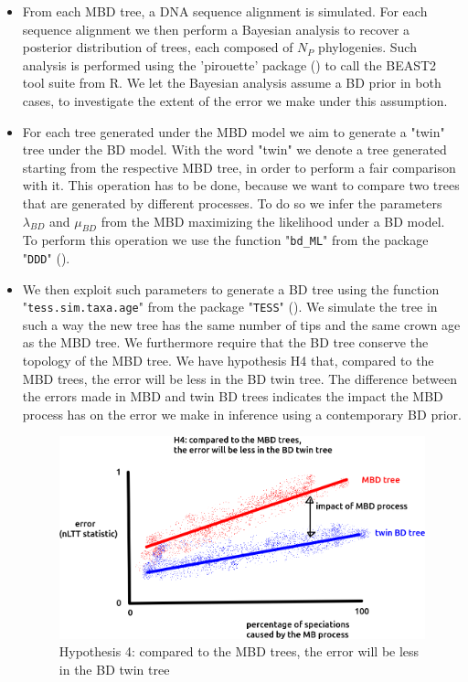 \documentclass{article}
\begin{document}
\begin{itemize}
\item From each MBD tree, a DNA sequence alignment is simulated. 
For each sequence alignment we then perform a Bayesian analysis 
to recover a posterior distribution of trees, 
each composed of $N_{P}$ phylogenies. 
Such analysis is performed using 
the 'pirouette' package (\cite{pirouette}) to call the BEAST2 tool 
suite from R. 
We let the Bayesian analysis assume a BD prior in both cases, 
to investigate the extent of the error we make under this assumption.

\item For each tree generated under the MBD model 
we aim to generate a "twin" tree under the BD model. 
With the word "twin" 
we denote a tree generated starting from the respective MBD tree, 
in order to perform a fair comparison with it. 
This operation has to be done, 
because we want to compare two trees 
that are generated by different processes. 
To do so we infer the parameters $\lambda_{BD}$ and $\mu_{BD}$ 
from the MBD maximizing the likelihood under a BD model. 
To perform this operation we use the function "\texttt{bd\_ML}" 
from the package "\texttt{DDD}" (\cite{etienne2012diversity}). 

\item We then exploit such parameters to generate a BD tree 
using the function "\texttt{tess.sim.taxa.age}" 
from the package "\texttt{TESS}" (\cite{Hoehna2013}). 
We simulate the tree in such a way the new tree 
has the same number of tips and the same crown age as the MBD tree. 
We furthermore require that the BD tree conserve the topology of the MBD tree.
We have hypothesis H4 that, compared to the MBD trees, 
the error will be less in the BD twin tree.
The difference between the errors made in MBD and twin BD trees indicates
the impact the MBD process has on the error we make in inference using a
contemporary BD prior.

\begin{figure}[!htbp]
  \includegraphics[width=\textwidth]{fig_h_4.png}
  \caption{
    Hypothesis 4: compared to the MBD trees, 
    the error will be less in the BD twin tree
  }
  \label{fig_h_4}
\end{figure}



\end{itemize}
\end{document}

